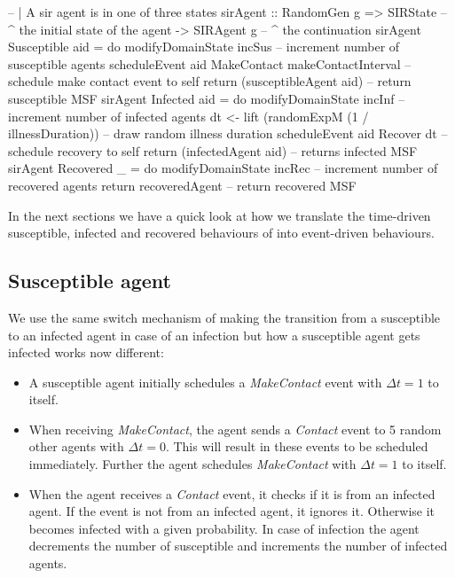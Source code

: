 \begin{HaskellCode}
-- | A sir agent is in one of three states
sirAgent :: RandomGen g 
         => SIRState    -- ^ the initial state of the agent
         -> SIRAgent g  -- ^ the continuation
sirAgent Susceptible aid = do
    modifyDomainState incSus -- increment number of susceptible agents
    scheduleEvent aid MakeContact makeContactInterval -- schedule make contact event to self
    return (susceptibleAgent aid) -- return susceptible MSF
sirAgent Infected aid = do
    modifyDomainState incInf -- increment number of infected agents
    dt <- lift (randomExpM (1 / illnessDuration)) -- draw random illness duration
    scheduleEvent aid Recover dt -- schedule recovery to self
    return (infectedAgent aid) -- returns infected MSF 
sirAgent Recovered _ = do
    modifyDomainState incRec -- increment number of recovered agents
    return recoveredAgent -- return recovered MSF
\end{HaskellCode}

In the next sections we have a quick look at how we translate the time-driven susceptible, infected and recovered behaviours of into event-driven behaviours.

\subsection{Susceptible agent}
We use the same switch mechanism of making the transition from a susceptible to an infected agent in case of an infection but how a susceptible agent gets infected works now different:

\begin{itemize}
	\item A susceptible agent initially schedules a \textit{MakeContact} event with $\Delta t = 1$ to itself.
	\item When receiving \textit{MakeContact}, the agent sends a \textit{Contact} event to 5 random other agents with $\Delta t = 0$. This will result in these events to be scheduled immediately. Further the agent schedules \textit{MakeContact} with $\Delta t = 1$ to itself.
	\item When the agent receives a \textit{Contact} event, it checks if it is from an infected agent. If the event is not from an infected agent, it ignores it. Otherwise it becomes infected with a given probability. In case of infection the agent decrements the number of susceptible and increments the number of infected agents.
\end{itemize}

